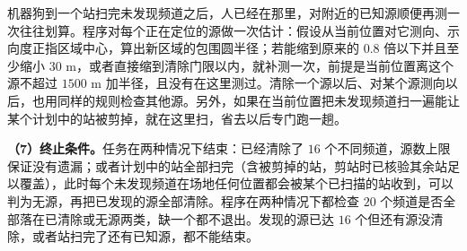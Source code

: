 机器狗到一个站扫完未发现频道之后，人已经在那里，对附近的已知源顺便再测一次往往划算。程序对每个正在定位的源做一次估计：假设从当前位置对它测向、示向度正指区域中心，算出新区域的包围圆半径；若能缩到原来的 $0.8$ 倍以下并且至少缩小 $30$ m，或者直接缩到清除门限以内，就补测一次，前提是当前位置离这个源不超过 $1500$ m 加半径，且没有在这里测过。清除一个源以后、对某个源测向以后，也用同样的规则检查其他源。另外，如果在当前位置把未发现频道扫一遍能让某个计划中的站被剪掉，就在这里扫，省去以后专门跑一趟。

\textbf{（7）终止条件。}任务在两种情况下结束：已经清除了 $16$ 个不同频道，源数上限保证没有遗漏；或者计划中的站全部扫完（含被剪掉的站，剪站时已核验其余站足以覆盖），此时每个未发现频道在场地任何位置都会被某个已扫描的站收到，可以判为无源，再把已发现的源全部清除。程序在两种情况下都检查 $20$ 个频道是否全部落在已清除或无源两类，缺一个都不退出。发现的源已达 $16$ 个但还有源没清除，或者站扫完了还有已知源，都不能结束。

